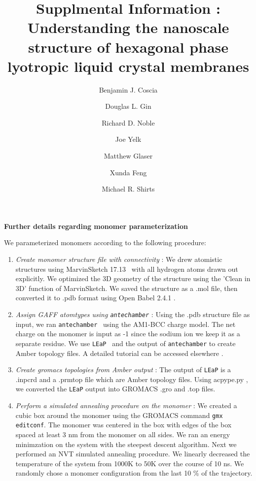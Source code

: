 \documentclass{article}
\title{Supplmental Information : Understanding the nanoscale structure of hexagonal phase lyotropic liquid crystal membranes}
\author{Benjamin J. Coscia \and Douglas L. Gin \and Richard D. Noble \and Joe Yelk \and Matthew Glaser \and Xunda Feng \and Michael R. Shirts}
\begin{document}
  
  \graphicspath{{./figures/}}  %
  \maketitle

  \noindent
  \begingroup
	\fontsize{14pt}{14pt}\selectfont
	\textbf{Further details regarding monomer parameterization} 
  \endgroup
 
  \vspace{1em}
  We parameterized monomers according to the following procedure:
  \begin{enumerate}
	\item \textit{Create monomer structure file with connectivity} : We
	drew atomistic structures using MarvinSketch
	17.13~\cite{chemaxon_marvinsketch_2017} with all hydrogen atoms drawn out
	explicitly. We optimized the 3D geometry of the structure using the 'Clean in
	3D' function of MarvinSketch.  We saved the structure as a .mol file, then
	converted it to .pdb format using Open Babel 2.4.1
	\cite{oboyle_open_2011,noauthor_open_nodate}. 
	\item \textit{Assign GAFF atomtypes using \texttt{antechamber}} : Using
	the .pdb structure file as input, we ran
	\texttt{antechamber}~\cite{wang_automatic_2006} using the AM1-BCC charge model.
	The net charge on the monomer is input as -1 since the sodium ion we keep it as
	a separate residue. We use \texttt{LEaP}~\cite{case_ambertools_nodate} and the
	output of \texttt{antechamber} to create Amber topology files. A detailed
	tutorial can be accessed elsewhere \cite{walker_antechamber_nodate}.
	\item \textit{Create gromacs topologies from Amber output} : The output
	of \texttt{LEaP} is a .inpcrd and a .prmtop file which are Amber topology
	files. Using acpype.py \cite{sousa_da_silva_acpype_2012}, we converted the
	\texttt{LEaP} output into GROMACS .gro and .top files. 
	\item \textit{Perform a simulated annealing procedure on the monomer} :
	We created a cubic box around the monomer using the GROMACS command \texttt{gmx
	editconf}. The monomer was centered in the box with edges of the
	box spaced at least 3 nm from the monomer on all sides. We ran an energy minimzation
	on the system with the steepest descent algorithm. Next we performed an NVT
	simulated annealing procedure. We linearly decreased the temperature of the
	system from 1000K to 50K over the course of 10 ns. We randomly chose a monomer
	configuration from the last 10 \% of the trajectory. 

\end{enumerate}
\end{document}
